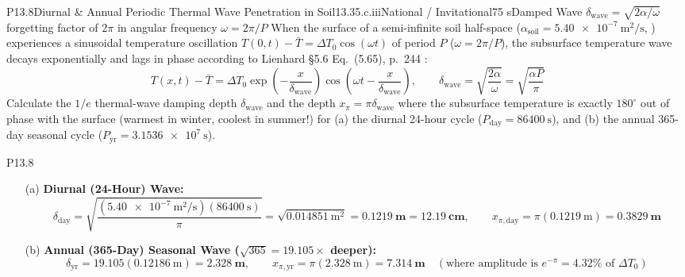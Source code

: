 \begin{problem}{P13.8}{Diurnal \& Annual Periodic Thermal Wave Penetration in Soil}{13.3}{5.c.iii}{National / Invitational}{75 s}{Damped Wave $\delta_{\mathrm{wave}} = \sqrt{2\alpha/\omega}$}{forgetting factor of $2\pi$ in angular frequency $\omega = 2\pi/P$}
When the surface of a semi-infinite soil half-space ($\alpha_{\mathrm{soil}} = \SI{5.40e-7}{\square\meter\per\second}$, ) experiences a sinusoidal temperature oscillation $T(0,t) - \bar{T} = \Delta T_0 \cos(\omega t)$ of period $P$ ($\omega = 2\pi/P$), the subsurface temperature wave decays exponentially and lags in phase according to Lienhard §5.6 Eq.~(5.65), p.~244 :
\[
  T(x,t) - \bar{T} = \Delta T_0 \exp\!\left(-\frac{x}{\delta_{\mathrm{wave}}}\right)\cos\!\left(\omega t - \frac{x}{\delta_{\mathrm{wave}}}\right), \qquad \delta_{\mathrm{wave}} = \sqrt{\frac{2\alpha}{\omega}} = \sqrt{\frac{\alpha P}{\pi}}
\]
Calculate the $1/e$ thermal-wave damping depth $\delta_{\mathrm{wave}}$ and the depth $x_{\pi} = \pi\delta_{\mathrm{wave}}$ where the subsurface temperature is exactly $180^\circ$ out of phase with the surface (warmest in winter, coolest in summer!) for (a) the diurnal 24-hour cycle ($P_{\mathrm{day}} = \SI{86400}{\second}$), and (b) the annual 365-day seasonal cycle ($P_{\mathrm{yr}} = \SI{3.1536e7}{\second}$).
\end{problem}
\begin{solution}{P13.8}
\begin{enumerate}
  \item[(a)] \textbf{Diurnal (24-Hour) Wave:}
  \[
    \delta_{\mathrm{day}} = \sqrt{\frac{(\SI{5.40e-7}{\square\meter\per\second})(\SI{86400}{\second})}{\pi}} = \sqrt{\SI{0.014851}{\square\meter}} = \mathbf{\SI{0.1219}{\meter}} = \mathbf{\SI{12.19}{\centi\meter}}, \qquad
    x_{\pi,\mathrm{day}} = \pi(\SI{0.1219}{\meter}) = \mathbf{\SI{0.3829}{\meter}}
  \]
  \item[(b)] \textbf{Annual (365-Day) Seasonal Wave ($\sqrt{365} = 19.105\times$ deeper):}
  \[
    \delta_{\mathrm{yr}} = 19.105(\SI{0.12186}{\meter}) = \mathbf{\SI{2.328}{\meter}}, \qquad
    x_{\pi,\mathrm{yr}} = \pi(\SI{2.328}{\meter}) = \mathbf{\SI{7.314}{\meter}} \quad (\text{where amplitude is } e^{-\pi} = \mathbf{4.32\%}\text{ of }\Delta T_0)
  \]
\end{enumerate}
\end{solution}

